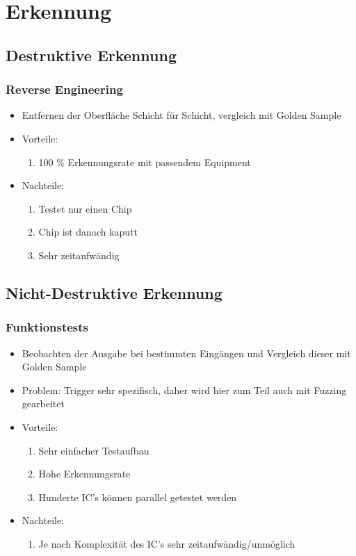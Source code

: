 \documentclass[11pt]{beamer}
\begin{document}
\section{Erkennung}
\subsection{Destruktive Erkennung}
\begin{frame}
    \frametitle{Reverse Engineering}
    \begin{itemize}
        \item Entfernen der Oberfläche Schicht für Schicht, vergleich mit Golden Sample
        \item Vorteile: 
        \begin{enumerate}
            \item 100 \% Erkennungsrate mit passendem Equipment
        \end{enumerate}
        \item Nachteile:
        \begin{enumerate}
            \item Testet nur einen Chip
            \item Chip ist danach kaputt
            \item Sehr zeitaufwändig
        \end{enumerate}
    \end{itemize}
\end{frame}
\subsection{Nicht-Destruktive Erkennung}
\begin{frame}
    \frametitle{Funktionstests}
    \begin{itemize}
        \item Beobachten der Ausgabe bei bestimmten Eingängen und Vergleich dieser mit Golden Sample
        \item Problem: Trigger sehr spezifisch, daher wird hier zum Teil auch mit Fuzzing gearbeitet
        \item Vorteile:
        \begin{enumerate}
            \item Sehr einfacher Testaufbau
            \item Hohe Erkennungsrate
            \item Hunderte IC's können parallel getestet werden
        \end{enumerate}
        \item Nachteile:
        \begin{enumerate}
            \item Je nach Komplexität des IC's sehr zeitaufwändig/unmöglich
        \end{enumerate}
    \end{itemize}
\end{frame}
\end{document}
